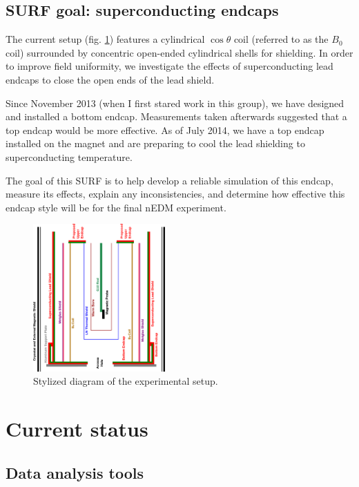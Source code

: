 \documentclass[twocolumn,aps,prb,citeautoscript]{revtex4-1}
\begin{document}
\subsection{SURF goal: superconducting endcaps}

The current setup (fig. \ref{fig:structure})
features a cylindrical $\cos\theta$ coil \cite{coil} (referred to as the $B_0$ coil)
surrounded by concentric open-ended cylindrical shells for shielding.
In order to improve field uniformity, we investigate the effects of superconducting
lead endcaps to close the open ends of the lead shield.

Since November 2013 (when I first stared work in this group), we have designed and installed
a bottom endcap. Measurements taken afterwards suggested that a top endcap would be more
effective. As of July 2014, we have a top endcap installed on the magnet and are preparing
to cool the lead shielding to superconducting temperature.

The goal of this SURF is to help develop a reliable simulation of
this endcap, measure its effects, explain any inconsistencies, and determine how effective
this endcap style will be for the final nEDM experiment.

\begin{figure}
\includegraphics[width=0.45\textwidth]{../edm_1314year/out.eps}
\caption{\label{fig:structure}Stylized diagram of the experimental
setup.}
\end{figure}

\section{Current status}

\subsection{Data analysis tools}
\end{document}
